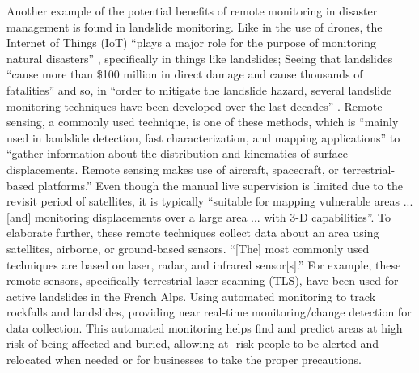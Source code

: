 \documentclass[conference]{IEEEtran}
\begin{document}
Another example of the potential benefits of remote monitoring in disaster management is found in 
landslide monitoring. Like in the use of drones, the Internet of Things (IoT) ``plays a major role for the 
purpose of monitoring natural disasters'' \cite{b7}, specifically in things like landslides; Seeing that 
landslides ``cause more than \$100 million in direct damage and cause thousands of fatalities'' \cite{b7}
and so, in ``order to mitigate the landslide hazard, several landslide monitoring techniques have been 
developed over the last decades'' \cite{b7}.  Remote sensing, a commonly used technique, is one of these 
methods, which is ``mainly used in landslide detection, fast characterization, and mapping 
applications'' to ``gather information about the distribution and kinematics of surface displacements. Remote 
sensing makes use of aircraft, spacecraft, or terrestrial-based platforms.'' \cite{b7} Even though the 
manual live supervision is limited due to the revisit period of satellites, it is typically ``suitable for 
mapping vulnerable areas ... [and] monitoring displacements over a large area ... with 3-D capabilities''.
\cite{b7} To elaborate further, these remote techniques collect data about an area using satellites, 
airborne, or ground-based sensors. ``[The] most commonly used techniques are based on laser, radar, and 
infrared sensor[s].'' \cite{b7} For example, these remote sensors, specifically terrestrial laser scanning 
(TLS), have been used for active landslides in the French Alps. Using automated monitoring to track 
rockfalls and landslides, providing near real-time monitoring/change detection for data collection. This 
automated monitoring helps find and predict areas at high risk of being affected and buried, allowing at-
risk people to be alerted and relocated when needed or for businesses to take the proper precautions.\par
\end{document}
